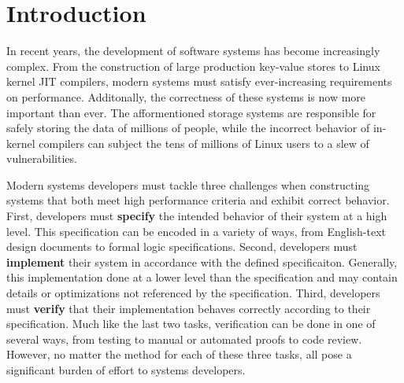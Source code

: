 \chapter{Introduction}

In recent years, the development of software systems has become increasingly
complex.
From the construction of large production key-value stores to Linux kernel JIT compilers,
modern systems must satisfy ever-increasing requirements on performance.
Additonally, the
correctness of these systems is now more important than ever. The
afformentioned storage systems are responsible for safely storing the data
of millions of people, while
the incorrect behavior of in-kernel compilers can subject the tens of millions of
Linux users to a slew of vulnerabilities.

Modern systems developers must tackle three challenges when constructing
systems that both meet high performance criteria and exhibit correct behavior.
First, developers must \textbf{specify} the intended behavior of their system at a high
level. This specification can be encoded in a variety of ways, from
English-text design documents to formal logic specifications.
Second, developers must \textbf{implement} their system in accordance with the defined
specificaiton. Generally, this implementation done at a lower level than the
specification and may contain details or optimizations not referenced by the specification.
Third, developers must \textbf{verify} that their implementation behaves correctly 
according to their specification. Much like the last two tasks, verification can be done
in one of several ways, from testing to manual or automated proofs to code review.
However, no matter the method for each of these three tasks,
all pose a significant burden of effort to systems developers.


